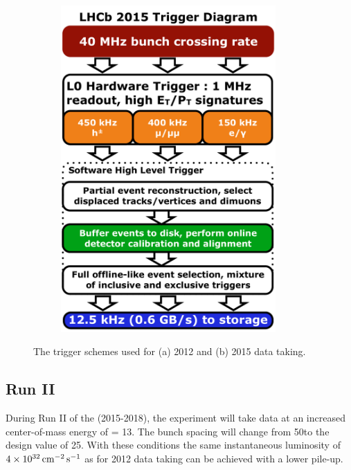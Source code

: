 \begin{figure}[!tb]
\begin{subfigure}{0.49\textwidth}
\includegraphics[width=0.9\textwidth]{figs/detector/trigger-runII.pdf}
\caption{}
\label{fig:trigger:runII}
\end{subfigure}
\caption{The trigger schemes used for (a) 2012 and (b) 2015 data taking.}
\label{fig:trigger}
\end{figure}

\subsection{\lhcb Run II}
\label{sec:lhcb:lhcb-run2}

During Run II of the \lhc (2015-2018), the \lhcb experiment will take data at an increased center-of-mass energy of \sqs = 13\tev. The bunch spacing will change from 50\ns to the design value of 25\ns. With these conditions the same instantaneous luminosity of $4\times10^{32}\mathrm{ \,cm}^{-2}\mathrm{{\,s}}^{-1}$ as for 2012 data taking can be achieved with a lower pile-up. 

